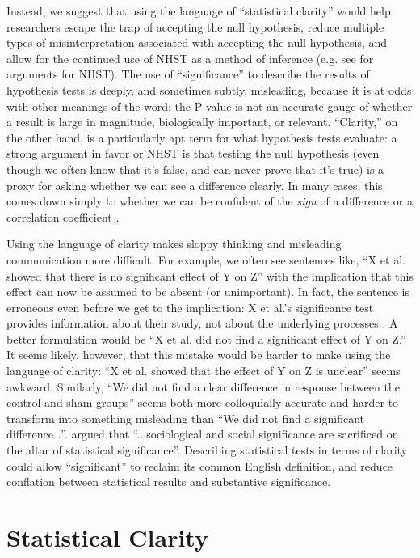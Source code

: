 Instead, we suggest that using the language of ``statistical clarity'' would help researchers escape the trap of accepting 
the null hypothesis, reduce multiple types of misinterpretation associated with accepting the null hypothesis, and allow for
the continued use of NHST as a method of inference (e.g.
see \citealt{Abelson1997} for arguments for NHST).
The use of ``significance'' to describe the results of hypothesis tests is deeply, and sometimes subtly, misleading, because it is at odds with other meanings of the word: the P value is not an accurate gauge of whether a result is large in magnitude, biologically important, or relevant.
``Clarity,'' on the other hand, is a particularly apt term for what hypothesis tests evaluate: a strong argument in favor or NHST is that testing the null hypothesis (even though we often know that it's false, and can never prove that it's true) is a proxy for asking whether we can see a difference clearly. In many cases, this comes down simply to whether we can be confident of the \emph{sign} of a difference or a correlation coefficient \cite{robinson2001past}.

Using the language of clarity makes sloppy thinking and misleading communication more difficult. 
For example, we often see sentences like, ``X et al. showed that there is no significant effect of Y on Z'' with the implication that this effect can now be assumed to be absent (or unimportant).
In fact, the sentence is erroneous even before we get to the implication: X et al.'s significance test provides information about their study, not about the underlying processes \cite{CanWeCiteThis}.
A better formulation would be ``X et al. did not find a significant effect of Y on Z.''
It seems likely, however, that this mistake would be harder to make using the language of clarity:  ``X et al. showed that the effect of Y on Z is unclear'' seems awkward.
Similarly, ``We did not find a clear difference in response between the control and sham groups'' seems both more colloquially accurate and harder to transform into something misleading than ``We did not find a significant difference\ldots''.
\citet{Bernardietal.2017} argued that ``...sociological and social significance are sacrificed on the altar of statistical significance''.
Describing statistical tests in terms of clarity could allow ``significant'' to reclaim its common English definition, and reduce conflation between statistical results and substantive significance.

\section*{Statistical Clarity}

